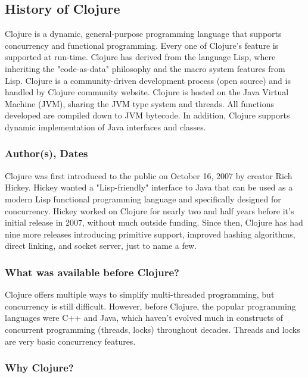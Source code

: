 \subsection{History of Clojure}
    Clojure is a dynamic, general-purpose programming language that supports concurrency and functional programming. Every one of Clojure's feature is supported at run-time. Clojure has derived from the language Lisp, where inheriting the "code-as-data" philosophy and the macro system features from Lisp. Clojure is a community-driven development process (open source) and is handled by Clojure community website. Clojure is hosted on the Java Virtual Machine (JVM), sharing the JVM type system and threads. All functions developed are compiled down to JVM bytecode. In addition, Clojure supports dynamic implementation of Java interfaces and classes.
    
\subsubsection{Author(s), Dates}

    Clojure was first introduced to the public on October 16, 2007 by creator Rich Hickey. Hickey wanted a "Lisp-friendly" interface to Java that can be used as a modern Lisp functional programming language and specifically designed for concurrency. Hickey worked on Clojure for nearly two and half years before it's initial release in 2007, without much outside funding. Since then, Clojure has had nine more releases introducing primitive support, improved hashing algorithms, direct linking, and socket server, just to name a few.   
    

\subsubsection{What was available before Clojure?}

    Clojure offers multiple ways to simplify multi-threaded programming, but concurrency is still difficult. However, before Clojure, the popular programming languages were C++ and Java, which haven't evolved much in constructs of concurrent programming (threads, locks) throughout decades. Threads and locks are very basic concurrency features. \cite{galpin_2010}

\subsubsection{Why Clojure?}

